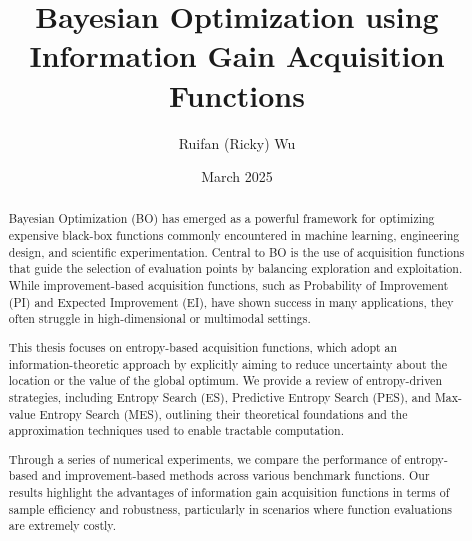 \documentclass{ut-thesis}
\title{Bayesian Optimization using Information Gain Acquisition Functions}
\author{Ruifan (Ricky) Wu}
\date{March 2025}
\begin{document}
\maketitle

\begin{abstract}
Bayesian Optimization (BO) has emerged as a powerful framework for optimizing expensive black-box functions commonly encountered in machine learning, engineering design, and scientific experimentation. Central to BO is the use of acquisition functions that guide the selection of evaluation points by balancing exploration and exploitation. While improvement-based acquisition functions, such as Probability of Improvement (PI) and Expected Improvement (EI), have shown success in many applications, they often struggle in high-dimensional or multimodal settings.

This thesis focuses on entropy-based acquisition functions, which adopt an information-theoretic approach by explicitly aiming to reduce uncertainty about the location or the value of the global optimum. We provide a review of entropy-driven strategies, including Entropy Search (ES), Predictive Entropy Search (PES), and Max-value Entropy Search (MES), outlining their theoretical foundations and the approximation techniques used to enable tractable computation.

Through a series of numerical experiments, we compare the performance of entropy-based and improvement-based methods across various benchmark functions. Our results highlight the advantages of information gain acquisition functions in terms of sample efficiency and robustness, particularly in scenarios where function evaluations are extremely costly. 
\end{abstract}
\end{document}
